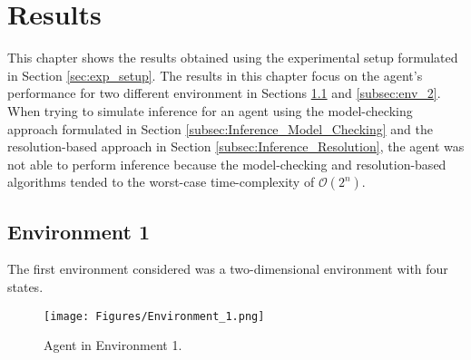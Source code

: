 





\chapter{Results} 
\label{chapter:Results}

This chapter shows the results obtained using the experimental setup formulated in Section \ref{sec:exp_setup}.
The results in this chapter focus on the agent's performance for two different environment in Sections \ref{subsec:env_1} and \ref{subsec:env_2}. When trying to simulate inference for an agent using the model-checking approach formulated in Section \ref{subsec:Inference_Model_Checking} and the resolution-based approach in Section \ref{subsec:Inference_Resolution}, the agent was not able to perform inference because the model-checking and resolution-based algorithms tended to the worst-case time-complexity of $\mathcal{O}(2^n)$.

\vspace{-0.4cm}

\section{Environment 1}
\label{subsec:env_1}

The first environment considered was a two-dimensional environment with four states.

\begin{figure}[H]
    \centering
    \texttt{[image: Figures/Environment\_1.png]}
    \caption{Agent in Environment 1.}
    \label{fig:env_1}
\end{figure}

